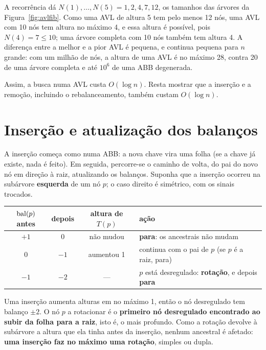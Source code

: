 \begin{exemplo}\label{ex:avlaltura}
A recorrência dá $N(1),\dots,N(5)=1,2,4,7,12$, os tamanhos das árvores da Figura~\ref{fig:avlfib}. Como uma AVL de altura 5 tem pelo menos 12 nós, uma AVL com 10 nós tem altura no máximo 4, e essa altura é possível, pois $N(4)=7\le10$; uma árvore completa com 10 nós também tem altura 4. A diferença entre a melhor e a pior AVL é pequena, e continua pequena para $n$ grande: com um milhão de nós, a altura de uma AVL é no máximo 28, contra 20 de uma árvore completa e até $10^6$ de uma ABB degenerada.
\end{exemplo}

Assim, a busca numa AVL custa $O(\log n)$. Resta mostrar que a inserção e a remoção, incluindo o rebalanceamento, também custam $O(\log n)$.

\section{Inserção e atualização dos balanços}\label{sec:avlins}
A inserção começa como numa ABB: a nova chave vira uma folha (se a chave já existe, nada é feito). Em seguida, percorre-se o caminho de volta, do pai do novo nó em direção à raiz, atualizando os balanços. Suponha que a inserção ocorreu na subárvore \textbf{esquerda} de um nó $p$; o caso direito é simétrico, com os sinais trocados.
\begin{center}
\small
\begin{tabular}{@{}cccl@{}}
\toprule
$\operatorname{bal}(p)$ antes & depois & altura de $T(p)$ & ação\\
\midrule
$+1$ & $0$ & não mudou & \textbf{para}: os ancestrais não mudam\\
$0$ & $-1$ & aumentou 1 & continua com o pai de $p$ (se $p$ é a raiz, para)\\
$-1$ & $-2$ & --- & $p$ está desregulado: \textbf{rotação}\index{rotacao@rotação}, e depois \textbf{para}\\
\bottomrule
\end{tabular}
\end{center}
Uma inserção aumenta alturas em no máximo 1, então o nó desregulado tem balanço $\pm2$. O nó $p$ a rotacionar é o \textbf{primeiro nó desregulado encontrado ao subir da folha para a raiz}, isto é, o mais profundo. Como a rotação devolve à subárvore a altura que ela tinha antes da inserção, nenhum ancestral é afetado: \textbf{uma inserção faz no máximo uma rotação}, simples ou dupla.

